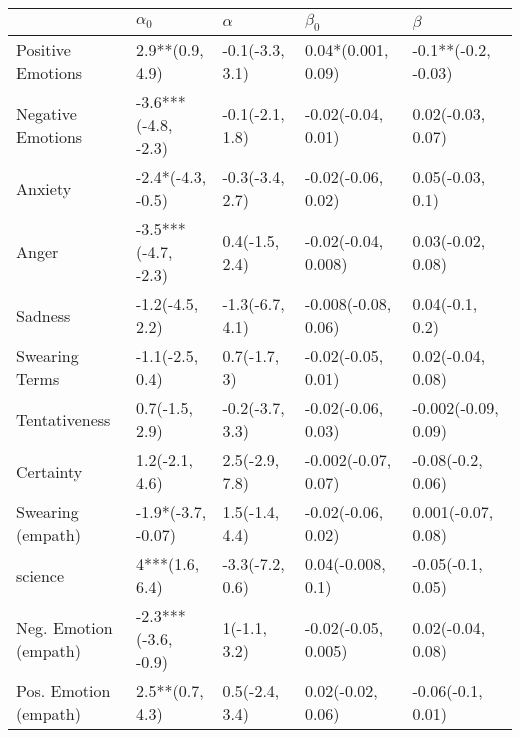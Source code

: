 \begin{tabular}{lllll}
\toprule
{} &           $\alpha_0$ &         $\alpha$ &            $\beta_0$ &              $\beta$ \\
\midrule
Positive Emotions     &      2.9**(0.9, 4.9) &  -0.1(-3.3, 3.1) &   0.04*(0.001, 0.09) &  -0.1**(-0.2, -0.03) \\
Negative Emotions     &  -3.6***(-4.8, -2.3) &  -0.1(-2.1, 1.8) &   -0.02(-0.04, 0.01) &    0.02(-0.03, 0.07) \\
Anxiety               &    -2.4*(-4.3, -0.5) &  -0.3(-3.4, 2.7) &   -0.02(-0.06, 0.02) &     0.05(-0.03, 0.1) \\
Anger                 &  -3.5***(-4.7, -2.3) &   0.4(-1.5, 2.4) &  -0.02(-0.04, 0.008) &    0.03(-0.02, 0.08) \\
Sadness               &      -1.2(-4.5, 2.2) &  -1.3(-6.7, 4.1) &  -0.008(-0.08, 0.06) &      0.04(-0.1, 0.2) \\
Swearing Terms        &      -1.1(-2.5, 0.4) &     0.7(-1.7, 3) &   -0.02(-0.05, 0.01) &    0.02(-0.04, 0.08) \\
Tentativeness         &       0.7(-1.5, 2.9) &  -0.2(-3.7, 3.3) &   -0.02(-0.06, 0.03) &  -0.002(-0.09, 0.09) \\
Certainty             &       1.2(-2.1, 4.6) &   2.5(-2.9, 7.8) &  -0.002(-0.07, 0.07) &    -0.08(-0.2, 0.06) \\
Swearing (empath)     &   -1.9*(-3.7, -0.07) &   1.5(-1.4, 4.4) &   -0.02(-0.06, 0.02) &   0.001(-0.07, 0.08) \\
science               &       4***(1.6, 6.4) &  -3.3(-7.2, 0.6) &    0.04(-0.008, 0.1) &    -0.05(-0.1, 0.05) \\
Neg. Emotion (empath) &  -2.3***(-3.6, -0.9) &     1(-1.1, 3.2) &  -0.02(-0.05, 0.005) &    0.02(-0.04, 0.08) \\
Pos. Emotion (empath) &      2.5**(0.7, 4.3) &   0.5(-2.4, 3.4) &    0.02(-0.02, 0.06) &    -0.06(-0.1, 0.01) \\
\bottomrule
\end{tabular}
